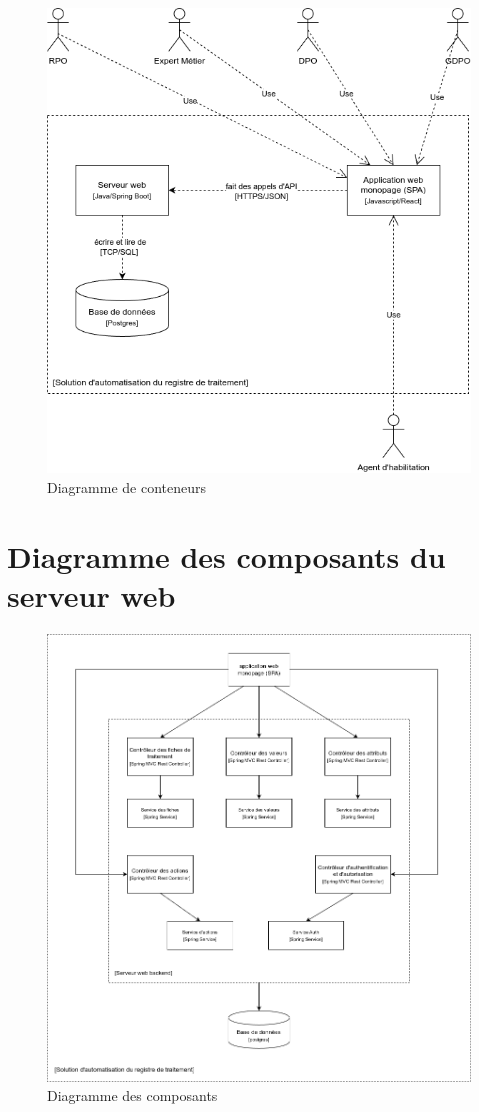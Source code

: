 \begin{figure}[H]
    \centering
    \includegraphics[width=.85\textwidth]{images/container-diagram.png}
    \caption{Diagramme de conteneurs}
\end{figure}

\clearpage


\section{Diagramme des composants du serveur web}

\begin{figure}[H]
    \centering
    \includegraphics[width=\textwidth]{images/component-diagram.png}
    \caption{Diagramme des composants}
\end{figure}



